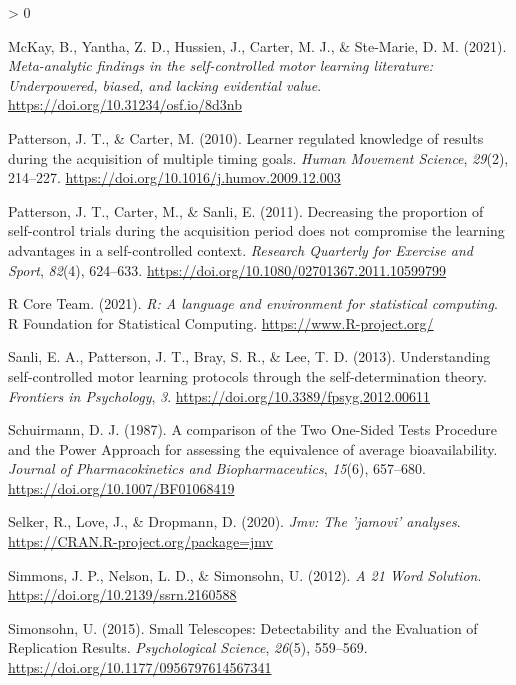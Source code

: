 \documentclass[
  english,
  jou]{apa7}
\newlength{\cslhangindent}
\newenvironment{CSLReferences}[2] %
 {%
  \setlength{\parindent}{0pt}
  \ifodd #1 \everypar{\setlength{\hangindent}{\cslhangindent}}\ignorespaces\fi
  \ifnum #2 > 0
  \setlength{\parskip}{#2\baselineskip}
  \fi
 }%
 {}
\begin{document}
\begin{CSLReferences}{1}{0}
\leavevmode\hypertarget{ref-mckay2021}{}%
McKay, B., Yantha, Z. D., Hussien, J., Carter, M. J., \& Ste-Marie, D. M. (2021). \emph{Meta-analytic findings in the self-controlled motor learning literature: Underpowered, biased, and lacking evidential value}. \url{https://doi.org/10.31234/osf.io/8d3nb}

\leavevmode\hypertarget{ref-patterson2010}{}%
Patterson, J. T., \& Carter, M. (2010). Learner regulated knowledge of results during the acquisition of multiple timing goals. \emph{Human Movement Science}, \emph{29}(2), 214--227. \url{https://doi.org/10.1016/j.humov.2009.12.003}

\leavevmode\hypertarget{ref-patterson2011}{}%
Patterson, J. T., Carter, M., \& Sanli, E. (2011). Decreasing the proportion of self-control trials during the acquisition period does not compromise the learning advantages in a self-controlled context. \emph{Research Quarterly for Exercise and Sport}, \emph{82}(4), 624--633. \url{https://doi.org/10.1080/02701367.2011.10599799}

\leavevmode\hypertarget{ref-R-base}{}%
R Core Team. (2021). \emph{R: A language and environment for statistical computing}. R Foundation for Statistical Computing. \url{https://www.R-project.org/}

\leavevmode\hypertarget{ref-sanli2013}{}%
Sanli, E. A., Patterson, J. T., Bray, S. R., \& Lee, T. D. (2013). Understanding self-controlled motor learning protocols through the self-determination theory. \emph{Frontiers in Psychology}, \emph{3}. \url{https://doi.org/10.3389/fpsyg.2012.00611}

\leavevmode\hypertarget{ref-schuirmann1987}{}%
Schuirmann, D. J. (1987). A comparison of the Two One-Sided Tests Procedure and the Power Approach for assessing the equivalence of average bioavailability. \emph{Journal of Pharmacokinetics and Biopharmaceutics}, \emph{15}(6), 657--680. \url{https://doi.org/10.1007/BF01068419}

\leavevmode\hypertarget{ref-R-jmv}{}%
Selker, R., Love, J., \& Dropmann, D. (2020). \emph{Jmv: The 'jamovi' analyses}. \url{https://CRAN.R-project.org/package=jmv}

\leavevmode\hypertarget{ref-simmons2012}{}%
Simmons, J. P., Nelson, L. D., \& Simonsohn, U. (2012). \emph{A 21 Word Solution}. \url{https://doi.org/10.2139/ssrn.2160588}

\leavevmode\hypertarget{ref-simonsohn2015}{}%
Simonsohn, U. (2015). Small Telescopes: Detectability and the Evaluation of Replication Results. \emph{Psychological Science}, \emph{26}(5), 559--569. \url{https://doi.org/10.1177/0956797614567341}


\end{CSLReferences}
\end{document}
